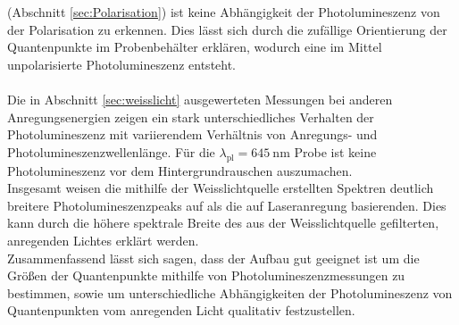 (Abschnitt \ref{sec:Polarisation}) ist keine Abhängigkeit der Photolumineszenz
von der Polarisation zu erkennen. Dies lässt sich durch die zufällige Orientierung
der Quantenpunkte im Probenbehälter erklären, wodurch eine im Mittel unpolarisierte Photolumineszenz entsteht.\\
\\
Die in Abschnitt \ref{sec:weisslicht} ausgewerteten Messungen bei anderen Anregungsenergien
zeigen ein stark unterschiedliches Verhalten der Photolumineszenz
mit variierendem Verhältnis von Anregungs- und Photolumineszenzwellenlänge.
Für die $\lambda_{\text{pl}} = \SI{645}{\nano\meter}$ Probe ist keine Photolumineszenz
vor dem Hintergrundrauschen auszumachen. \\
Insgesamt weisen die mithilfe der Weisslichtquelle erstellten Spektren deutlich breitere
Photolumineszenzpeaks auf als die auf Laseranregung basierenden. Dies kann durch die
höhere spektrale Breite des aus der Weisslichtquelle gefilterten, anregenden Lichtes erklärt werden.\\

Zusammenfassend lässt sich sagen, dass der Aufbau gut geeignet ist um die Größen der
Quantenpunkte mithilfe von Photolumineszenzmessungen zu bestimmen, sowie um unterschiedliche
Abhängigkeiten der Photolumineszenz von Quantenpunkten vom anregenden Licht qualitativ festzustellen.
%
%
